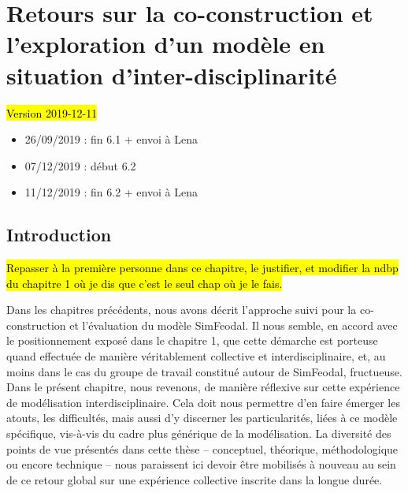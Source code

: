 \setcounter{chapter}{5}
\graphicspath{{chap6/}}

\chapter{Retours sur la co-construction et l'exploration d'un modèle en situation d'inter-disciplinarité}
\label{chap:chap6}
\vspace*{-2.5em}
\begin{center}
	{\large \hl{Version 2019-12-11}}
\end{center}
\vspace*{-1em}
\begin{itemize}
	\item 26/09/2019 : fin 6.1 + envoi à Lena
	\item 07/12/2019 : début 6.2
	\item 11/12/2019 : fin 6.2 + envoi à Lena
\end{itemize} 
\vspace*{-1em}
\setcounter{minitocdepth}{2}
\minitoc
\clearpage
{}

\section*{Introduction}

\begin{center}
	\hl{Repasser à la première personne dans ce chapitre, le justifier, et modifier la ndbp du chapitre 1 où je dis que c'est le seul chap où je le fais.}
\end{center}

Dans les chapitres précédents, nous avons décrit l'approche suivi pour la co-construction et l'évaluation du modèle SimFeodal.
Il nous semble, en accord avec le positionnement exposé dans le chapitre 1, que cette démarche est porteuse quand effectuée de manière véritablement collective et interdisciplinaire, et, au moins dans le cas du groupe de travail constitué autour de SimFeodal, fructueuse.
Dans le présent chapitre, nous revenons, de manière réflexive sur cette expérience de modélisation interdisciplinaire.
Cela doit nous permettre d'en faire émerger les atouts, les difficultés, mais aussi d'y discerner les particularités, liées à ce modèle spécifique, vis-à-vis du cadre plus générique de la modélisation.
La diversité des points de vue présentés dans cette thèse -- conceptuel, théorique, méthodologique ou encore technique -- nous paraissent ici devoir être mobilisés à nouveau au sein de ce retour global sur une expérience collective inscrite dans la longue durée.

